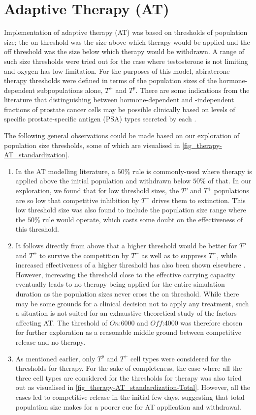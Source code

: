 \section{Adaptive Therapy (AT)}
Implementation of adaptive therapy (AT) was based on thresholds of population size; the on threshold was the size above which therapy would be applied and the off threshold was the size below which therapy would be withdrawn. A range of such size thresholds were tried out for the case where testosterone is not limiting and oxygen has low limitation. For the purposes of this model, abiraterone therapy thresholds were defined in terms of the population sizes of the hormone-dependent subpopulations alone, $T^+$ and $T^p$. There are some indications from the literature that distinguishing between hormone-dependent and -independent fractions of prostate cancer cells may be possible clinically based on levels of specific prostate-specific antigen (PSA) types secreted by each \cite{Takahashi}.

The following general observations could be made based on our exploration of population size thresholds, some of which are visualised in \autoref{fig_therapy-AT_standardization}.
\begin{enumerate}
  \item In the AT modelling literature, a $50\%$ rule is commonly-used where therapy is applied above the initial population and withdrawn below $50\%$ of that. In our exploration, we found that for low threshold sizes, the $T^p$ and $T^+$ populations are so low that competitive inhibition by $T^-$ drives them to extinction. This low threshold size was also found to include the population size range where the $50\%$ rule would operate, which casts some doubt on the effectiveness of this threshold.
  \item It follows directly from above that a higher threshold would be better for $T^p$ and $T^+$ to survive the competition by $T^-$ as well as to suppress $T^-$, while increased effectiveness of a higher threshold has also been shown elsewhere \cite{Hansen}. However, increasing the threshold close to the effective carrying capacity eventually leads to no therapy being applied for the entire simulation duration as the population sizes never cross the on threshold. While there may be some grounds for a clinical decision not to apply any treatment, such a situation is not suited for an exhaustive theoretical study of the factors affecting AT. The threshold of $On$:6000 and $Off$:4000 was therefore chosen for further exploration as a reasonable middle ground between competitive release and no therapy.
  \item As mentioned earlier, only $T^p$ and $T^+$ cell types were considered for the thresholds for therapy. For the sake of completeness, the case where all the three cell types are considered for the thresholds for therapy was also tried out as visualised in \autoref{fig_therapy-AT_standardization-Total}. However, all the cases led to competitive release in the initial few days, suggesting that total population size makes for a poorer cue for AT application and withdrawal.
\end{enumerate}

